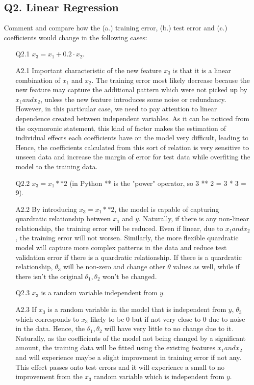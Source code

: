 \documentclass[11pt]{scrartcl}
\begin{document}
\subsection*{Q2. Linear Regression}
Comment and compare how the (a.) training error, (b.) test error and (c.) coefficients would change in the following cases:
\begin{itemize}
\item[Q2.1] $x_3 = x_1 + 0.2 \cdot x_2$.
\item[A2.1] Important characteristic of the new feature $x_3$ is that it is a linear combination of $x_1$ and $x_2$. The training error most likely decrease because the new feature may capture the additional pattern which were not picked up by $x_1 and x_2$, unless the new feature introduces some noise or redundancy. However, in this particular case, we need to pay attention to linear dependence created between independent variables. As it can be noticed from the oxymoronic statement, this kind of factor makes the estimation of individual effects each coefficients have on the model very difficult, leading to Hence, the coefficients calculated from this sort of relation is very sensitive to unseen data and increase the margin of error for test data while overfiting the model to the training data.\\

\item[Q2.2] $x_3 = x_1 ** 2$ (in Python ** is the "power" operator, so  3 ** 2 = 3 * 3 = 9).
\item[A2.2] By introducing $x_3=x_1**2$, the model is capable of capturing quardratic relationship between $x_1$ and $y$. Naturally, if there is any non-linear relationship, the training error will be reduced. Even if linear, due to $x_1 and x_2$, the training error will not worsen. Similarly, the more flexible quardratic model will capture more complex patterns in the data and reduce test validation error if there is a quardratic relationship. If there is a quardratic relationship, $\theta_3$ will be non-zero and change other $\theta$ values as well, while if there isn't the original $\theta_1, \theta_2$ won't be changed. \\

\item[Q2.3] $x_3$ is a random variable independent from $y$.
\item[A2.3] If $x_3$ is a random variable in the model that is independent from $y$, $\theta_3$ which corresponds to $x_3$ likely to be 0 but if not very close to 0 due to noise in the data. Hence, the $\theta_1, \theta_2$ will have very little to no change due to it. Naturally, as the coefficients of the model not being changed by a significant amount, the training data will be fitted using the existing features $x_1 and x_2$ and will experience maybe a slight improvment in training error if not any. This effect passes onto test errors and it will experience a small to no improvement from the $x_3$ random variable which is independent from $y$.\\


\end{itemize}
\end{document}
